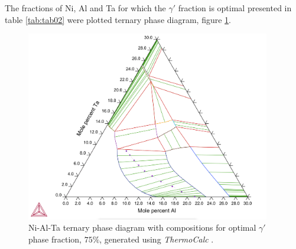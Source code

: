 The fractions of Ni, Al and Ta for which the $\gamma'$ fraction is optimal presented in table \ref{tab:tab02} were plotted ternary phase diagram, figure \ref{fig:diagram03}.

\begin{figure}[h]
  \centering
  \includegraphics[width=0.95\textwidth]{graficas/Q2_NiAlTa_ternary03.png}
  \caption{Ni-Al-Ta ternary phase diagram with compositions for optimal $\gamma'$ phase fraction, $75\%$, generated using \textit{ThermoCalc} \citep{thermocalc}.}
  \label{fig:diagram03}
\end{figure}